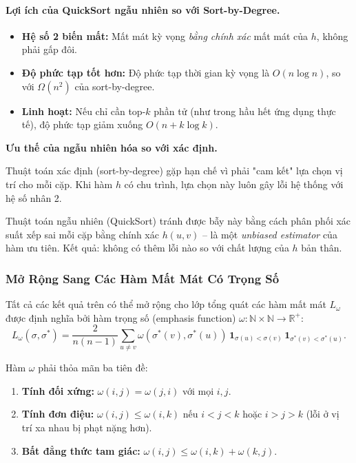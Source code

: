 \paragraph{Lợi ích của QuickSort ngẫu nhiên so với Sort-by-Degree.}
\begin{itemize}
    \item \textbf{Hệ số 2 biến mất:} Mất mát kỳ vọng \emph{bằng chính xác} mất mát của $h$, không phải gấp đôi.
    \item \textbf{Độ phức tạp tốt hơn:} Độ phức tạp thời gian kỳ vọng là $O(n \log n)$, so với $\Omega(n^2)$ của sort-by-degree.
    \item \textbf{Linh hoạt:} Nếu chỉ cần top-$k$ phần tử (như trong hầu hết ứng dụng thực tế), độ phức tạp giảm xuống $O(n + k \log k)$.
\end{itemize}

\begin{morong}
\textbf{Ưu thế của ngẫu nhiên hóa so với xác định.}

Thuật toán xác định (sort-by-degree) gặp hạn chế vì phải "cam kết" lựa chọn vị trí cho mỗi cặp. Khi hàm $h$ có chu trình, lựa chọn này luôn gây lỗi hệ thống với hệ số nhân 2.

Thuật toán ngẫu nhiên (QuickSort) tránh được bẫy này bằng cách phân phối xác suất xếp sai mỗi cặp bằng chính xác $h(u,v)$ -- là một \emph{unbiased estimator} của hàm ưu tiên. Kết quả: không có thêm lỗi nào so với chất lượng của $h$ bản thân.
\end{morong}

\subsubsection{Mở Rộng Sang Các Hàm Mất Mát Có Trọng Số}

\begin{definition}
Tất cả các kết quả trên có thể mở rộng cho lớp tổng quát các hàm mất mát $L_\omega$ được định nghĩa bởi hàm trọng số (emphasis function) $\omega: \mathbb{N} \times \mathbb{N} \to \mathbb{R}^+$:
\begin{equation}
    L_\omega(\sigma, \sigma^*) = \frac{2}{n(n-1)} \sum_{u \neq v} \omega(\sigma^*(v), \sigma^*(u))\, \mathbf{1}_{\sigma(u) < \sigma(v)}\, \mathbf{1}_{\sigma^*(v) < \sigma^*(u)}.
    \label{eq:loss_omega}
\end{equation}
\end{definition}

Hàm $\omega$ phải thỏa mãn ba tiên đề:
\begin{enumerate}
    \item \textbf{Tính đối xứng:} $\omega(i,j) = \omega(j,i)$ với mọi $i, j$.
    \item \textbf{Tính đơn điệu:} $\omega(i,j) \leq \omega(i,k)$ nếu $i < j < k$ hoặc $i > j > k$ (lỗi ở vị trí xa nhau bị phạt nặng hơn).
    \item \textbf{Bất đẳng thức tam giác:} $\omega(i,j) \leq \omega(i,k) + \omega(k,j)$.
\end{enumerate}

